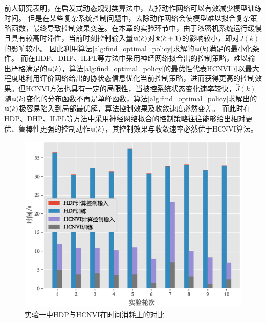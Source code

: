 前人研究表明，在启发式动态规划类算法中，去掉动作网络可以有效减少模型训练时间\cite{Luo2016,Padhi2006}。
但是在某些复杂系统控制问题中，去除动作网络会使模型难以拟合复杂策略函数，最终导致控制效果变差。在本章的实验环节中，由于浓密机系统运行缓慢且具有较高时滞性，当前时刻控制输入量${\mathbf
u}(k)$对$\hat{\mathbf x}(k+1)$的影响较小，即对$\hat{J}(k)$的影响较小。
因此利用算法\ref{alg:find_optimal_policy}求解的${\mathbf
u}(k)$满足的最小化条件。
而在HDP、DHP、ILPL等方法中采用神经网络拟合出的控制策略，难以输出严格满足的${\mathbf
u}(k)$，算法\ref{alg:find_optimal_policy}的最优性代表HCNVI可以最大程度地利用评价网络给出的协状态信息优化当前控制策略，进而获得更高的控制效果。但HCNVI方法也具有一定的局限性，当被控系统状态变化速率较快，$\hat{J}(k)$随${\mathbf
u}(k)$变化的分布函数不再是单峰函数，算法\ref{alg:find_optimal_policy}求解出的${\mathbf
u}(k)$极容易陷入到局部最优解，算法控制效果及收敛速度必然变差。
而此时在HDP、DHP、ILPL等方法中采用神经网络拟合的控制策略往往能够给出相对更优、鲁棒性更强的控制动作${\mathbf
u}(k)$，其控制效果与收敛速率必然优于HCNVI算法。




\begin{figure}[htb]
    \centering
    \includegraphics[width=0.9\linewidth]{figures/chapter6/fig9.eps}
    \caption{实验一中HDP与HCNVI在时间消耗上的对比 }
    \label{fig:stable_time_cmp}
\end{figure}

